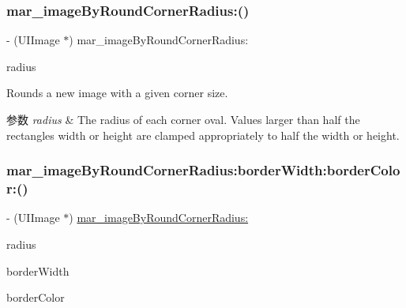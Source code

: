 \subsubsection{\texorpdfstring{mar\+\_\+image\+By\+Round\+Corner\+Radius\+:()}{mar\_imageByRoundCornerRadius:()}}
{\footnotesize\ttfamily -\/ (U\+I\+Image $\ast$) mar\+\_\+image\+By\+Round\+Corner\+Radius\+: \begin{DoxyParamCaption}\item[{(C\+G\+Float)}]{radius }\end{DoxyParamCaption}}

Rounds a new image with a given corner size.


\begin{DoxyParams}{参数}
{\em radius} & The radius of each corner oval. Values larger than half the rectangle\textquotesingle{}s width or height are clamped appropriately to half the width or height. \\
\hline
\end{DoxyParams}
\mbox{\label{category_u_i_image_07_m_a_r_e_x_08_aa4a0ad3a1b7d3e8a680be3b183e77ea4}} 
\subsubsection{\texorpdfstring{mar\+\_\+image\+By\+Round\+Corner\+Radius\+:border\+Width\+:border\+Color\+:()}{mar\_imageByRoundCornerRadius:borderWidth:borderColor:()}\hspace{0.1cm}{\footnotesize\ttfamily [1/2]}}
{\footnotesize\ttfamily -\/ (U\+I\+Image $\ast$) \hyperlink{category_u_i_image_07_m_a_r_e_x_08_a3928ead790b37d111c1e1c059c302211}{mar\+\_\+image\+By\+Round\+Corner\+Radius\+:} \begin{DoxyParamCaption}\item[{(C\+G\+Float)}]{radius }\item[{borderWidth:(C\+G\+Float)}]{border\+Width }\item[{borderColor:(U\+I\+Color $\ast$)}]{border\+Color }\end{DoxyParamCaption}\hspace{0.3cm}{\ttfamily [implementation]}}

